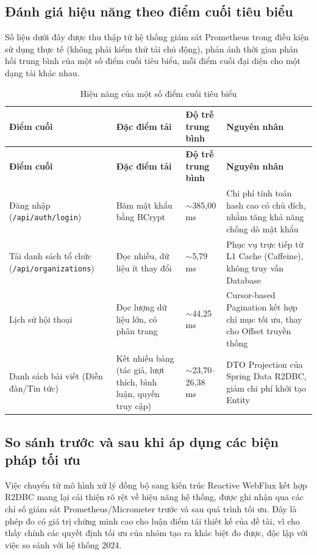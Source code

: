\documentclass[12pt,a4paper,oneside]{report}
\begin{document}
\subsection{Đánh giá hiệu năng theo điểm cuối tiêu biểu}
\label{subsec:apiperf}

Số liệu dưới đây được thu thập từ hệ thống giám sát Prometheus trong điều kiện sử dụng thực tế (không phải kiểm thử tải chủ động), phản ánh thời gian phản hồi trung bình của một số điểm cuối tiêu biểu, mỗi điểm cuối đại diện cho một dạng tải khác nhau.

\renewcommand{\arraystretch}{1.2}
\begin{longtable}{|>{\raggedright\arraybackslash}p{3.6cm}|>{\raggedright\arraybackslash}p{4.2cm}|>{\centering\arraybackslash}p{2.4cm}|>{\raggedright\arraybackslash}p{4.4cm}|}
\caption{Hiệu năng của một số điểm cuối tiêu biểu}\label{tab:apiperf}\\
\hline \textbf{Điểm cuối} & \textbf{Đặc điểm tải} & \textbf{Độ trễ trung bình} & \textbf{Nguyên nhân} \\ \hline
\endfirsthead
\hline \textbf{Điểm cuối} & \textbf{Đặc điểm tải} & \textbf{Độ trễ trung bình} & \textbf{Nguyên nhân} \\ \hline
\endhead
Đăng nhập (\texttt{/api/auth/login}) & Băm mật khẩu bằng BCrypt & $\sim$385,00 ms & Chi phí tính toán hash cao có chủ đích, nhằm tăng khả năng chống dò mật khẩu \\ \hline
Tải danh sách tổ chức (\texttt{/api/organizations}) & Đọc nhiều, dữ liệu ít thay đổi & $\sim$5,79 ms & Phục vụ trực tiếp từ L1 Cache (Caffeine), không truy vấn Database \\ \hline
Lịch sử hội thoại & Đọc lượng dữ liệu lớn, có phân trang & $\sim$44,25 ms & Cursor-based Pagination kết hợp chỉ mục tối ưu, thay cho Offset truyền thống \\ \hline
Danh sách bài viết (Diễn đàn/Tin tức) & Kết nhiều bảng (tác giả, lượt thích, bình luận, quyền truy cập) & $\sim$23,70--26,38 ms & DTO Projection của Spring Data R2DBC, giảm chi phí khởi tạo Entity \\ \hline
\end{longtable}
\renewcommand{\arraystretch}{1}

\subsection{So sánh trước và sau khi áp dụng các biện pháp tối ưu}
\label{subsec:beforeafter}

Việc chuyển từ mô hình xử lý đồng bộ sang kiến trúc Reactive WebFlux kết hợp R2DBC mang lại cải thiện rõ rệt về hiệu năng hệ thống, được ghi nhận qua các chỉ số giám sát Prometheus/Micrometer trước và sau quá trình tối ưu. Đây là phép đo có giá trị chứng minh cao cho luận điểm tái thiết kế của đề tài, vì cho thấy chính các quyết định tối ưu của nhóm tạo ra khác biệt đo được, độc lập với việc so sánh với hệ thống 2024.
\end{document}
